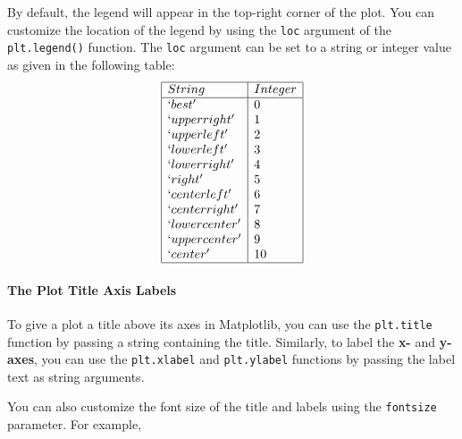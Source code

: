 \documentclass[11pt]{article}
\begin{document}
By default, the legend will appear in the top-right corner of the plot.
You can customize the location of the legend by using the \texttt{loc}
argument of the \texttt{plt.legend()} function. The \texttt{loc}
argument can be set to a string or integer value as given in the
following table:
$$
\begin{array}{|l|l|}
\hline
String & Integer \\
\hline
`best' & 0 \\
`upper right' & 1 \\
`upper left' & 2 \\
`lower left' & 3 \\
`lower right' & 4 \\
`right' & 5 \\
`center left' & 6 \\
`center right' & 7 \\
`lower center' & 8 \\
`upper center' & 9 \\
`center' & 10 \\
\hline
\end{array}$$

\hypertarget{the-plot-title-axis-labels}{%
\paragraph{The Plot Title Axis
Labels}\label{the-plot-title-axis-labels}}

To give a plot a title above its axes in Matplotlib, you can use the
\texttt{plt.title} function by passing a string containing the title.
Similarly, to label the \textbf{x-} and \textbf{y-axes}, you can use the
\texttt{plt.xlabel} and \texttt{plt.ylabel} functions by passing the
label text as string arguments.

You can also customize the font size of the title and labels using the
\texttt{fontsize} parameter. For example,
\end{document}
